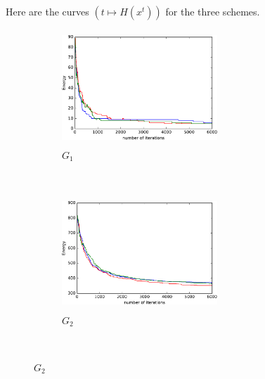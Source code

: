 \documentclass[a4paper]{article}
\begin{document}
Here are the curves $(t \mapsto H(x^t))$ for the three schemes. 
\begin{figure}[H]
    \centering
    \begin{subfigure}[b]{0.45\textwidth}
        \includegraphics[width=2.3in, height = 1.7in]{../Plots/SimulatedAnnealing/H_G1.pdf}
        \caption{$G_1$}
        \label{fig:g1}
    \end{subfigure}
    ~ %
    \begin{subfigure}[b]{0.45\textwidth}
        \includegraphics[width=2.3in, height=1.7in]{../Plots/SimulatedAnnealing/H_G2.pdf}
        \caption{$G_2$}
        \label{fig:g2}
    \end{subfigure}
    ~ %
    

\end{figure}
\end{document}
